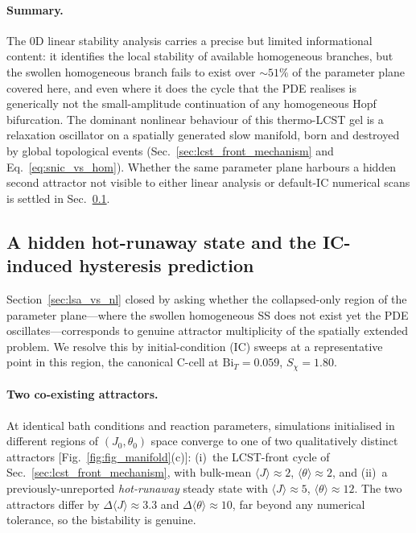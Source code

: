 \documentclass[aps,pre,reprint,superscriptaddress,longbibliography,floatfix]{revtex4-2}
\newcommand{\Bi}{\mathrm{Bi}}
\begin{document}
\FloatBarrier

\paragraph{Summary.}
The 0D linear stability analysis carries a precise but limited
informational content: it identifies the local stability of available
homogeneous branches, but the swollen homogeneous branch fails to
exist over $\sim\!51\%$ of the parameter plane covered here, and even
where it does the cycle that the PDE realises is generically not the
small-amplitude continuation of any homogeneous Hopf bifurcation.
The dominant nonlinear behaviour of this thermo-LCST gel is a
relaxation oscillator on a spatially generated slow manifold, born
and destroyed by global topological events
(Sec.~\ref{sec:lcst_front_mechanism} and
Eq.~\eqref{eq:snic_vs_hom}).  Whether the same parameter plane
harbours a hidden second attractor not visible to either linear
analysis or default-IC numerical scans is settled in
Sec.~\ref{sec:multistability}.

\subsection{A hidden hot-runaway state and the IC-induced
hysteresis prediction}
\label{sec:multistability}

Section~\ref{sec:lsa_vs_nl} closed by asking whether the
collapsed-only region of the parameter plane—where the swollen
homogeneous SS does not exist yet the PDE oscillates—corresponds to
genuine attractor multiplicity of the spatially extended problem.
We resolve this by initial-condition (IC) sweeps at a representative
point in this region, the canonical C-cell at $\Bi_T=0.059$,
$S_\chi=1.80$.

\paragraph{Two co-existing attractors.}
At identical bath conditions and reaction parameters, simulations
initialised in different regions of $(J_0, \theta_0)$ space converge
to one of two qualitatively distinct attractors
[Fig.~\ref{fig:fig_manifold}(c)]: (i)~the LCST-front cycle of
Sec.~\ref{sec:lcst_front_mechanism}, with bulk-mean
$\langle J\rangle\!\approx\!2$,
$\langle\theta\rangle\!\approx\!2$, and (ii)~a previously-unreported
\emph{hot-runaway} steady state with
$\langle J\rangle\!\approx\!5$,
$\langle\theta\rangle\!\approx\!12$.  The two attractors differ by
$\Delta\langle J\rangle\!\approx\!3.3$ and
$\Delta\langle\theta\rangle\!\approx\!10$, far beyond any numerical
tolerance, so the bistability is genuine.
\end{document}
